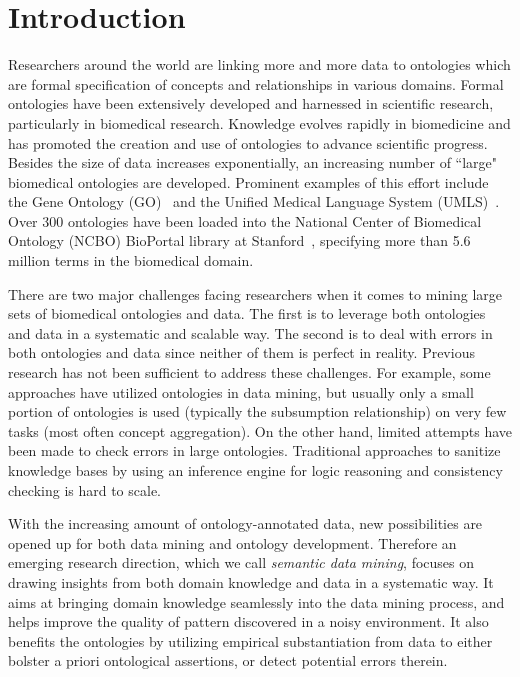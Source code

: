 \section{Introduction}
\label{sec:intro}

Researchers around the world are linking more and more data to ontologies which are formal specification of concepts and relationships in various domains. Formal ontologies have been extensively developed and harnessed in scientific research, particularly in biomedical research. Knowledge evolves rapidly in biomedicine and has promoted the creation and use of ontologies to advance scientific progress.  Besides the size of data increases exponentially, an increasing number of ``large" biomedical ontologies are developed. Prominent examples of this effort include the Gene Ontology (GO)~\cite{GO} and the Unified Medical Language System (UMLS)~\cite{UMLS}. Over 300 ontologies have been loaded into the National Center of Biomedical Ontology (NCBO) BioPortal library at Stanford~\cite{Noy2009}, specifying more than 5.6 million terms in the biomedical domain.

There are two major challenges facing researchers when it comes to mining large sets of biomedical ontologies and data. The first is to leverage both ontologies and data in a systematic and scalable way. The second is to deal with errors in both ontologies and data since neither of them is perfect in reality. Previous research has not been sufficient to address these challenges. For example, some approaches have utilized ontologies in data mining, but usually only a small portion of ontologies is used (typically the subsumption relationship) on very few tasks (most often concept aggregation). On the other hand, limited attempts have been made to check errors in large ontologies. Traditional approaches to sanitize knowledge bases by using an inference engine for logic reasoning and consistency checking is hard to scale.

With the increasing amount of ontology-annotated data, new possibilities are opened up for both data mining and ontology development. Therefore an emerging research direction, which we call \textit{semantic data mining}, focuses on drawing insights from both domain knowledge and data in a systematic way. It aims at bringing domain knowledge seamlessly into the data mining process, and helps improve the quality of pattern discovered in a noisy environment. It also benefits the ontologies by utilizing empirical substantiation from data to either bolster a priori ontological assertions, or detect potential errors therein.

